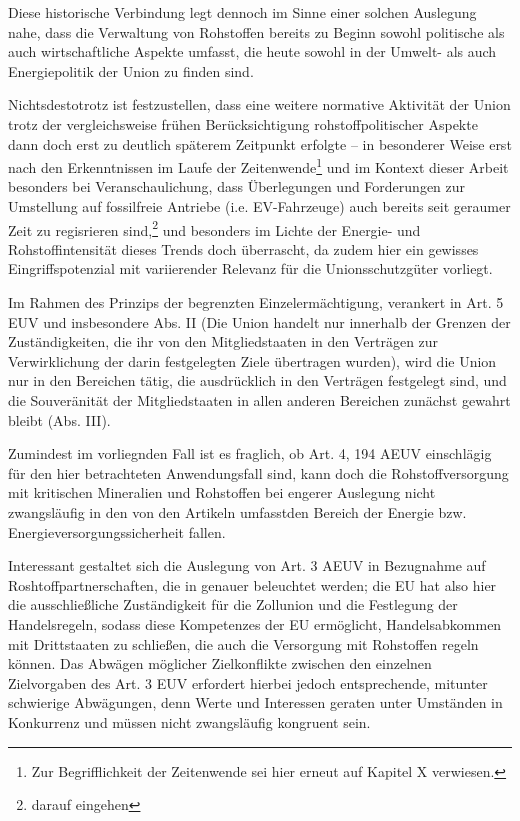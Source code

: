 \documentclass[12pt,a4paper,oneside]{book} %
\begin{document}
	Diese historische Verbindung legt dennoch im Sinne einer solchen Auslegung nahe, dass die Verwaltung von Rohstoffen bereits zu Beginn sowohl politische als auch wirtschaftliche Aspekte umfasst, die heute sowohl in der Umwelt- als auch Energiepolitik der Union zu finden sind.
	
	Nichtsdestotrotz ist festzustellen, dass eine weitere normative Aktivität der Union trotz der vergleichsweise frühen Berücksichtigung rohstoffpolitischer Aspekte dann doch erst zu deutlich späterem Zeitpunkt erfolgte -- in besonderer Weise erst nach den Erkenntnissen im Laufe der Zeitenwende\footnote{Zur Begrifflichkeit der Zeitenwende sei hier erneut auf Kapitel X verwiesen.} und im Kontext dieser Arbeit besonders bei Veranschaulichung, dass Überlegungen und Forderungen zur Umstellung auf fossilfreie Antriebe (i.e. EV-Fahrzeuge) auch bereits seit geraumer Zeit zu regisrieren sind,\footnote{darauf eingehen} und besonders im Lichte der Energie- und Rohstoffintensität dieses Trends doch überrascht, da zudem hier ein gewisses Eingriffspotenzial mit variierender Relevanz für die Unionsschutzgüter vorliegt. 
	
	Im Rahmen des Prinzips der begrenzten Einzelermächtigung, verankert in Art. 5 EUV  und insbesondere Abs. II (Die Union handelt nur innerhalb der Grenzen der Zuständigkeiten, die ihr von den Mitgliedstaaten in den Verträgen zur Verwirklichung der darin festgelegten Ziele übertragen wurden), wird die Union nur in den Bereichen tätig, die ausdrücklich in den Verträgen festgelegt sind, und  die Souveränität der Mitgliedstaaten in allen anderen Bereichen zunächst gewahrt bleibt (Abs. III).
	
	Zumindest im vorliegnden Fall ist es fraglich, ob Art. 4, 194 AEUV einschlägig für den hier betrachteten Anwendungsfall sind, kann doch die Rohstoffversorgung mit kritischen Mineralien und Rohstoffen bei engerer Auslegung nicht zwangsläufig in den von den Artikeln umfasstden Bereich der Energie bzw. Energieversorgungssicherheit fallen.
	
	Interessant gestaltet sich die Auslegung von Art. 3 AEUV in Bezugnahme auf Roshtoffpartnerschaften, die in %
	genauer beleuchtet werden; die EU hat also hier die ausschließliche Zuständigkeit für die Zollunion und die Festlegung der Handelsregeln, sodass diese Kompetenzes der EU ermöglicht, Handelsabkommen mit Drittstaaten zu schließen, die auch die Versorgung mit Rohstoffen regeln können. Das Abwägen möglicher Zielkonflikte zwischen den einzelnen Zielvorgaben des Art. 3 EUV erfordert hierbei jedoch entsprechende, mitunter schwierige Abwägungen, denn Werte und Interessen geraten unter Umständen in Konkurrenz und müssen nicht zwangsläufig kongruent sein.\autocite{Müller-Ibold/Herrmann, EuZW 2022, 1029, 1030} 
	
\end{document}
